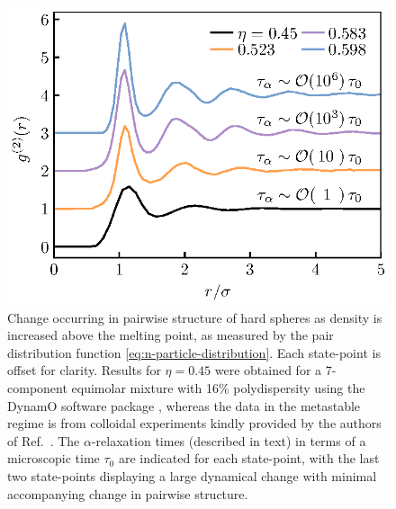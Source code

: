 \documentclass[11pt,twoside]{report}
\begin{document}
\begin{figure}
  \includegraphics[width=0.9\linewidth,outer]{g2-evolution}
  \caption[Structural change in the supercooled liquid (at the pair level)]{
    Change occurring in pairwise structure of hard spheres as density is increased above the melting point, as measured by the pair distribution function \eqref{eq:n-particle-distribution}.
    Each state-point is offset for clarity.
    Results for $\eta = 0.45$ were obtained for a 7-component equimolar mixture with 16\% polydispersity using the DynamO software package \cite{BannermanJCC2011}, whereas the data in the metastable regime is from colloidal experiments kindly provided by the authors of Ref.\ \cite{HallettNC2018}.
    The $\alpha$-relaxation times (described in text) in terms of a microscopic time $\tau_0$ are indicated for each state-point, with the last two state-points displaying a large dynamical change with minimal accompanying change in pairwise structure.
  }
  \label{fig:g2-changes}
\end{figure}
\end{document}
